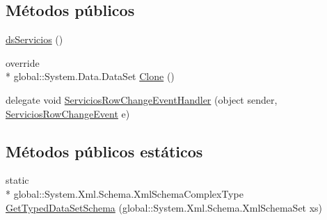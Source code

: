 \subsection*{Métodos públicos}
\begin{DoxyCompactItemize}
\item 
\hyperlink{class_proyecto___integrador__3_1_1ds_servicios_a0734e62bba29ca7515ed72f2aee94662}{ds\-Servicios} ()
\item 
override \\*
global\-::\-System.\-Data.\-Data\-Set \hyperlink{class_proyecto___integrador__3_1_1ds_servicios_a6925c56a7154d89ed11f16a7b45434f7}{Clone} ()
\item 
delegate void \hyperlink{class_proyecto___integrador__3_1_1ds_servicios_a12a7c95915227392e001d214be4c6c58}{Servicios\-Row\-Change\-Event\-Handler} (object sender, \hyperlink{class_proyecto___integrador__3_1_1ds_servicios_1_1_servicios_row_change_event}{Servicios\-Row\-Change\-Event} e)
\end{DoxyCompactItemize}
\subsection*{Métodos públicos estáticos}
\begin{DoxyCompactItemize}
\item 
static \\*
global\-::\-System.\-Xml.\-Schema.\-Xml\-Schema\-Complex\-Type \hyperlink{class_proyecto___integrador__3_1_1ds_servicios_a4df975c629e0d4abeb51fc99bd5d9cdd}{Get\-Typed\-Data\-Set\-Schema} (global\-::\-System.\-Xml.\-Schema.\-Xml\-Schema\-Set xs)
\end{DoxyCompactItemize}
